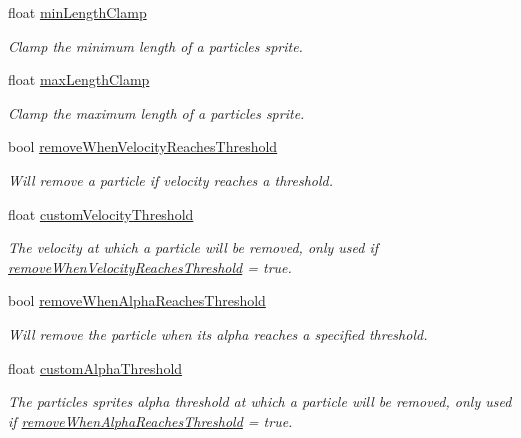 \begin{DoxyCompactItemize}
float \hyperlink{struct_p_e2_d_1_1_particle_builder_aff3a3bd2b886093998811a30e7a906fd}{min\+Length\+Clamp}
\begin{DoxyCompactList}\small\item\em Clamp the minimum length of a particles sprite. \end{DoxyCompactList}\item 
float \hyperlink{struct_p_e2_d_1_1_particle_builder_a80efc62ef75c9a7c127caa527e7c83ca}{max\+Length\+Clamp}
\begin{DoxyCompactList}\small\item\em Clamp the maximum length of a particles sprite. \end{DoxyCompactList}\item 
bool \hyperlink{struct_p_e2_d_1_1_particle_builder_a2c37b78b4c75113fb9703c760cd1a34c}{remove\+When\+Velocity\+Reaches\+Threshold}
\begin{DoxyCompactList}\small\item\em Will remove a particle if velocity reaches a threshold. \end{DoxyCompactList}\item 
float \hyperlink{struct_p_e2_d_1_1_particle_builder_a5feb3a73d241bbf14bd2a51ec94835b2}{custom\+Velocity\+Threshold}
\begin{DoxyCompactList}\small\item\em The velocity at which a particle will be removed, only used if \hyperlink{struct_p_e2_d_1_1_particle_builder_a2c37b78b4c75113fb9703c760cd1a34c}{remove\+When\+Velocity\+Reaches\+Threshold} = true. \end{DoxyCompactList}\item 
bool \hyperlink{struct_p_e2_d_1_1_particle_builder_a18a773bd0ec19ac1eeb2e86603bd3395}{remove\+When\+Alpha\+Reaches\+Threshold}
\begin{DoxyCompactList}\small\item\em Will remove the particle when its alpha reaches a specified threshold. \end{DoxyCompactList}\item 
float \hyperlink{struct_p_e2_d_1_1_particle_builder_a4f81feb8debd8a2842d2d1b49fa842e2}{custom\+Alpha\+Threshold}
\begin{DoxyCompactList}\small\item\em The particles sprites alpha threshold at which a particle will be removed, only used if \hyperlink{struct_p_e2_d_1_1_particle_builder_a18a773bd0ec19ac1eeb2e86603bd3395}{remove\+When\+Alpha\+Reaches\+Threshold} = true. \end{DoxyCompactList}\end{DoxyCompactItemize}


